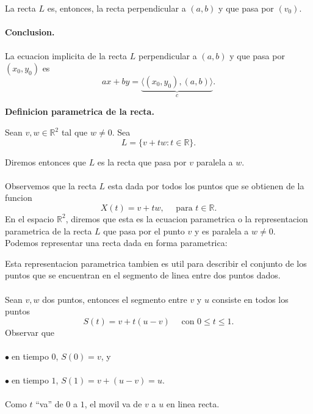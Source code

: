 \documentclass{article}
\theoremstyle{definition}
\theoremstyle{definition}
\theoremstyle{remark}
\newcommand\bl{$\bullet\;$}
\begin{document}
La recta $L$ es, entonces, la recta perpendicular a $(a,b)$ y que pasa por $(v_0)$. \\\\
\textbf{Conclusion.}\\\\
La ecuacion implicita de la recta $L$ perpendicular a $(a,b)$ y que pasa por $(x_0,y_0)$ es \[
  ax+by=\underbrace{\big\langle (x_0,y_0),(a,b) \big\rangle}_{c}.
\]
\begin{center}
\textbf{Definicion parametrica de la recta.}
\end{center}
\begin{defi}
  Sean $v,w \in \mathbb{R}^2$ tal que $w \neq 0$. Sea \[
    L=\{v+tw : t \in \mathbb{R} \}.
  \]
\end{defi}
Diremos entonces que $L$ es la recta que pasa por $v$ paralela a $w$.\\\\
Observemos que la recta $L$ esta dada por todos los puntos que se obtienen de la funcion \[
  X(t)=v+tw, \quad \text{ para } t \in \mathbb{R}.
\]
En el espacio $\mathbb{R}^2$, diremos que esta es la ecuacion parametrica o la representacion parametrica de la recta $L$ que pasa por el punto $v$ y es paralela a $w \neq 0$.\\
Podemos representar una recta dada en forma parametrica:
\begin{figure}[h]
\centering
\def\svgwidth{0.75\textwidth}

\end{figure}
Esta representacion parametrica tambien es util para describir el conjunto de los puntos que se encuentran en el segmento de linea entre dos puntos dados.\\\\
Sean $v,w$ dos puntos, entonces el segmento entre $v$ y $u$ consiste en todos los puntos \[
  S(t)=v+t(u-v) \quad \text{ con } 0 \leq t \leq 1.
\]
Observar que \\\\ \bl en tiempo $0$, $S(0)=v$, y \\\\ \bl en tiempo $1$, $S(1)=v+(u-v)=u$.\\\\
Como $t$ ``va'' de $0$ a $1$, el movil va de $v$ a $u$ en linea recta.\\\\
\end{document}
